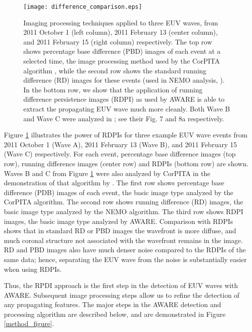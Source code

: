 \begin{figure}
\begin{center}
\texttt{[image: difference\_comparison.eps]}
\caption{Imaging processing techniques applied to three EUV waves,
  from 2011 October 1 (left column), 2011 February 13 (center column),
  and 2011 February 15 (right column) respectively. The top row shows
  percentage base difference (PBD) images of each event at a selected
  time, the image processing method used by the CorPITA algorithm
  \citep{2014SoPh..289.3279L}, while the second row shows the standard
  running difference (RD) images for these events (used in NEMO
  analysis, \citep{2005SoPh..228..265P}). In the bottom row, we show
  that the application of running difference persistence images (RDPI)
  as used by AWARE is able to extract the propagating EUV wave much
  more cleanly. Both Wave B and Wave C were analyzed in
  \cite{2014SoPh..289.3279L}; see their Fig. 7 and 8a respectively.}
\label{rpdm_figure}
\end{center}
\end{figure}

Figure \ref{rpdm_figure} illustrates the power of RDPIs for three
example EUV wave events from 2011 October 1 (Wave A), 2011 February 13
(Wave B), and 2011 February 15 (Wave C) respectively. For each event,
percentage base difference images (top row), running difference images
(center row) and RDPIs (bottom row) are shown. Waves B and C from
Figure \ref{rpdm_figure} were also analyzed by CorPITA in the
demonstration of that algorithm by \citet{2014SoPh..289.3279L}.  The
first row shows percentage base difference (PDB) images of each event,
the basic image type analyzed by the CorPITA algorithm.  The second
row shows running difference (RD) images, the basic image type
analyzed by the NEMO algorithm.  The third row shows RDPI images, the
basic image type analyzed by AWARE. Comparison with RDPIs shows that
in standard RD or PBD images the wavefront is more diffuse, and much
coronal structure not associated with the wavefront remains in the
image. RD and PBD images also have much denser noise compared to the
RDPIs of the same data; hence, separating the EUV wave from the noise
is substantially easier when using RDPIs.

Thus, the RPDI approach is the first step in the detection of EUV
waves with AWARE. Subsequent image processing steps allow us to refine
the detection of any propagating features. The major steps in the
AWARE detection and processing algorithm are described below, and are
demonstrated in Figure \ref{method_figure}.


